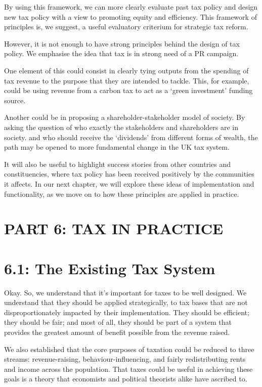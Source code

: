 \documentclass[]{tufte-handout}
\begin{document}
By using this framework, we can more clearly evaluate past tax policy
and design new tax policy with a view to promoting equity and
efficiency. This framework of principles is, we suggest, a useful
evaluatory criterium for strategic tax reform.

However, it is not enough to have strong principles behind the design of
tax policy. We emphasise the idea that tax is in strong need of a PR
campaign.

One element of this could consist in clearly tying outputs from the
spending of tax revenue to the purpose that they are intended to tackle.
This, for example, could be using revenue from a carbon tax to act as a
`green investment' funding source.

Another could be in proposing a shareholder-stakeholder model of
society. By asking the question of who exactly the stakeholders and
shareholders are in society. and who should receive the `dividends' from
different forms of wealth, the path may be opened to more fundamental
change in the UK tax system.

It will also be useful to highlight success stories from other countries
and constituencies, where tax policy has been received positively by the
communities it affects. In our next chapter, we will explore these ideas
of implementation and functionality, as we move on to how these
principles are applied in practice.

\newpage

\hypertarget{part-6-tax-in-practice}{%
\section{PART 6: TAX IN PRACTICE}\label{part-6-tax-in-practice}}

\hypertarget{the-existing-tax-system}{%
\section{6.1: The Existing Tax System}\label{the-existing-tax-system}}

Okay. So, we understand that it's important for taxes to be well
designed. We understand that they should be applied strategically, to
tax bases that are not disproportionately impacted by their
implementation. They should be efficient; they should be fair; and most
of all, they should be part of a system that provides the greatest
amount of benefit possible from the revenue raised.

We also established that the core purposes of taxation could be reduced
to three streams: revenue-raising, behaviour-influencing, and fairly
redistributing rents and income across the population. That taxes could
be useful in achieving these goals is a theory that economists and
political theorists alike have ascribed to.
\end{document}
